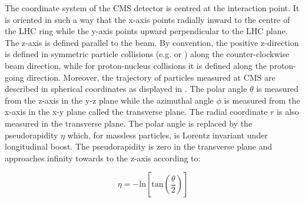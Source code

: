 The coordinate system of the CMS detector is centred at the interaction point. It is oriented in such a way that the x-axis points radially inward to the centre of the LHC ring while the y-axis points upward perpendicular to the LHC plane. The z-axis is defined parallel to the beam. By convention, the positive z-direction is defined in symmetric particle collisions (e.g. \Runpp or \RunPbPb) along the counter-clockwise beam direction, while for proton-nucleus collisions it is defined along the proton-going direction. Moreover, the trajectory of particles measured at CMS are described in spherical coordinates as displayed in . The polar angle $\theta$ is measured from the z-axis in the y-z plane while the azimuthal angle $\phi$ is measured from the x-axis in the x-y plane called the transverse plane. The radial coordinate $r$ is also measured in the transverse plane. The polar angle is replaced by the pseudorapidity $\eta$ which, for massless particles, is Lorentz invariant under longitudinal boost. The pseudorapidity is zero in the transverse plane and approaches infinity towards to the z-axis according to:

\begin{equation}
  \eta = -\mathrm{ln}\left[\mathrm{tan}\left(\frac{\theta}{2}\right)\right]
\end{equation}


